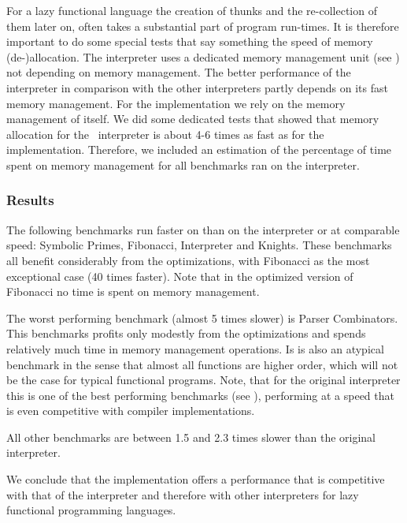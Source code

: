 For a lazy functional language the creation of thunks and the re-collection of them later on, often takes a substantial part of program run-times.
It is therefore important to do some special tests that say something the speed of memory (de-)allocation.
The \Sapl interpreter uses a dedicated memory management unit (see \cite{JKP}) not depending on \Java memory management. 
The better performance of the \Sapl interpreter in comparison with the other interpreters partly depends on its fast memory management.
For the \JS implementation we rely on  the memory management of \JS itself.
We did some dedicated tests that showed that memory allocation for the \Java\ \Sapl interpreter is about 4-6 times as fast as for the \JS implementation.
Therefore, we included an estimation of the percentage of time spent on memory management for all benchmarks ran on  the \Sapljs interpreter.

\subsubsection{Results}
The following benchmarks run faster on \Sapljs than on the \Sapl interpreter or at comparable 
speed: \textsf{Symbolic Primes}, \textsf{Fibonacci}, \textsf{Interpreter} and \textsf{Knights}. These 
benchmarks all benefit considerably from the optimizations, with \textsf{Fibonacci} as the most 
exceptional case (40 times faster).
Note that in the optimized version of \textsf{Fibonacci} no time is spent on memory management.

The worst performing benchmark (almost 5 times slower) is \textsf{Parser Combinators}. 
This benchmarks profits only modestly  from the optimizations and spends relatively much time 
in memory management operations. Is is also an atypical benchmark in the sense that almost all 
functions are higher order, which will not be the case for
typical functional programs. Note, that for the original \Sapl interpreter this is one of the best 
performing benchmarks (see \cite{JKP}), 
performing at a speed that is even competitive with compiler implementations. 

All other benchmarks are between 1.5 and 2.3 times slower than the original \Sapl interpreter.

We conclude that  the \Sapljs implementation offers a performance that is competitive with that of the 
\Sapl interpreter and therefore
with other interpreters for lazy functional programming languages.


